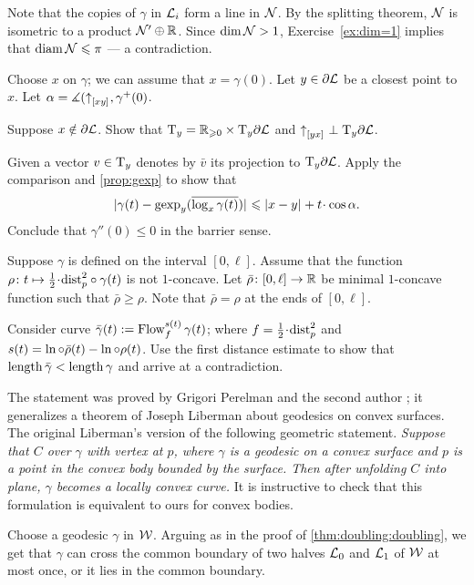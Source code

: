 Note that the copies of $\gamma$ in $\mathcal{L}_{i}$ form a line in $\mathcal{N}$.
By the splitting theorem, $\mathcal{N}$ is isometric to a product $\mathcal{N}'\oplus \mathbb{R}$.
Since $\operatorname{\rm dim}\nolimits\mathcal{N}>1$, Exercise~\ref{ex:dim=1} implies that $\operatorname{\rm diam}\nolimits\mathcal{N}\leqslant \pi$ --- a contradiction.

 Choose $x$ on $\gamma$;
we can assume that $x=\gamma(0)$.
Let $y\in \partial \mathcal{L}$ be a closest point to $x$.
Let $\alpha=\measuredangle({\uparrow}_{[{x}{y}]_{{}}},\gamma^+(0)$.

Suppose $x\notin \partial \mathcal{L}$.
Show that $\mathrm{T}_y=\mathbb{R}_{\geqslant0}\times\mathrm{T}_y\partial \mathcal{L}$
and ${\uparrow}_{[{y}{x}]_{{}}}\perp \mathrm{T}_y\partial \mathcal{L}$.

Given a vector $v\in \mathrm{T}_y$ denotes by $\bar v$ its projection to $\mathrm{T}_y\partial \mathcal{L}$.
Apply the comparison and \ref{prop:gexp} to show that 
\[\dist{\gamma(t)}{\gexp_y(\overline{\log_x\gamma(t)})}{}\le \dist{x}{y}{}+t\cdot\cos\alpha.\]
Conclude that $\gamma''(0)\le 0$ in the barrier sense.


Suppose $\gamma$ is defined on the interval $[0,\ell]$.
Assume that the function $\rho\:t\mapsto \tfrac12\cdot\distfun_p^2\circ\gamma(t)$ is not $1$-concave.
Let $\bar\rho\colon[0,\ell]\to\mathbb{R}$ be minimal $1$-concave function such that $\bar\rho\ge \rho$.
Note that $\bar\rho=\rho$ at the ends of $[0,\ell]$.

Consider curve $\bar\gamma(t)\mathrel{:=} \mathop{\rm Flow}\nolimits_f^{s(t)}\gamma(t)$;
where $f=\tfrac12\cdot\distfun_p^2$ and $s(t)\z=\ln\circ\bar\rho(t)-\ln\circ\rho(t)$.
Use the first distance estimate to show that $\mathop{\rm length}\nolimits\bar\gamma<\mathop{\rm length}\nolimits\gamma$ and arrive at a contradiction.

The statement was proved by Grigori Perelman and the second author \cite{perelman-petrunin};
it generalizes a theorem of Joseph Liberman \cite{liberman} about geodesics on convex surfaces.
The original Liberman's version of the following geometric statement.
\textit{Suppose that $C$ over $\gamma$ with vertex at $p$,
where $\gamma$ is a geodesic on a convex surface and $p$ is a point in the convex body bounded by the surface.
Then after unfolding $C$ into plane, $\gamma$ becomes a locally convex curve.}
It is instructive to check that this formulation is equivalent to ours for convex bodies.

Choose a geodesic $\gamma$ in $\mathcal{W}$.
Arguing as in the proof of \ref{thm:doubling:doubling}, we get 
that $\gamma$ can cross the common boundary of two halves $\mathcal{L}_0$ and $\mathcal{L}_1$ of $\mathcal{W}$ at most once, or it lies in the common boundary.

